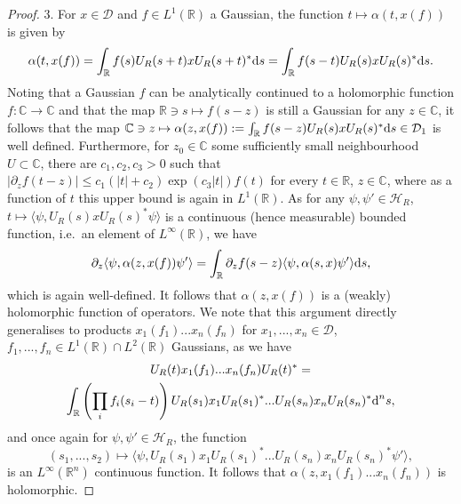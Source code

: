 \documentclass[sn-mathphys-num]{sn-jnl}%
\newcommand{\CC}{\mathbb{C}}
\newcommand{\RR}{\mathbb{R}}
\newcommand{\HH}{\mathcal{H}}
\newcommand{\diff}{\textup{d}}
\numberwithin{equation}{section}
\theoremstyle{thmstyleone}%
\theoremstyle{thmstyletwo}%
\theoremstyle{thmstylethree}%
\begin{document}
\begin{proof}
    3. For $x\in \mathcal{D}$ and $f\in L^1(\RR)$ a Gaussian, the function $t\mapsto \alpha(t,x(f))$ is given by
    \begin{equation}
        \alpha(t,x(f))=\int_\RR f(s)U_R(s+t)xU_R(s+t)^*\diff s=\int_\RR f(s-t)U_R(s)xU_R(s)^*\diff s.
    \end{equation}
    Noting that a Gaussian $f$ can be analytically continued to a holomorphic function $f:\CC\to \CC$ and that the map $\RR\ni s\mapsto f(s-z)$ is still a Gaussian for any $z\in\CC$, it follows that the map $\CC\ni z\mapsto \alpha(z,x(f)):=\int_\RR f(s-z)U_R(s)xU_R(s)^*\diff s\in \mathcal{D}_1$ is well defined. Furthermore, for $z_0\in \CC$ some sufficiently small neighbourhood $U\subset\CC$, there are $c_1,c_2,c_3>0$ such that $\vert \partial_zf(t-z)\vert \leq c_1(\vert t\vert +c_2)\exp(c_3\vert t\vert)f(t)$ for every $t\in\RR$, $z\in\CC$, where as a function of $t$ this upper bound is again in $L^1(\RR)$. As for any $\psi,\psi'\in\HH_R$,  $t\mapsto \langle\psi,U_R(s)xU_R(s)^*\psi\rangle$ is a continuous (hence measurable) bounded function, i.e.\ an element of $L^\infty(\RR)$, we have
    \begin{equation}
        \partial_z\langle\psi,\alpha(z,x(f))\psi'\rangle=\int_\RR \partial_zf(s-z)\langle\psi,\alpha(s,x)\psi'\rangle\diff s,
    \end{equation}
    which is again well-defined. It follows that $\alpha(z,x(f))$ is a (weakly) holomorphic function of operators. We note that this argument directly generalises to products $x_1(f_1)...x_n(f_n)$ for $x_1,...,x_n\in\mathcal{D}$, $f_1,...,f_n\in L^1(\RR)\cap L^2(\RR)$ Gaussians, as we have
    \begin{multline}
        U_R(t)x_1(f_1)...x_n(f_n)U_R(t)^*=\\
        \int_{\RR}\left(\prod_{i}f_i(s_i-t)\right)U_R(s_1)x_1U_R(s_1)^*...U_R(s_n)x_nU_R(s_n)^*\diff^n s,
    \end{multline}
   and once again for $\psi,\psi'\in\HH_R$, the function 
    \begin{equation}
        (s_1,...,s_2)\mapsto\langle\psi,U_R(s_1)x_1U_R(s_1)^*...U_R(s_n)x_nU_R(s_n)^*\psi'\rangle,
    \end{equation}
    is an $L^\infty(\RR^n)$ continuous function. It follows that $\alpha(z,x_1(f_1)...x_n(f_n))$ is holomorphic.
\end{proof}
\end{document}
